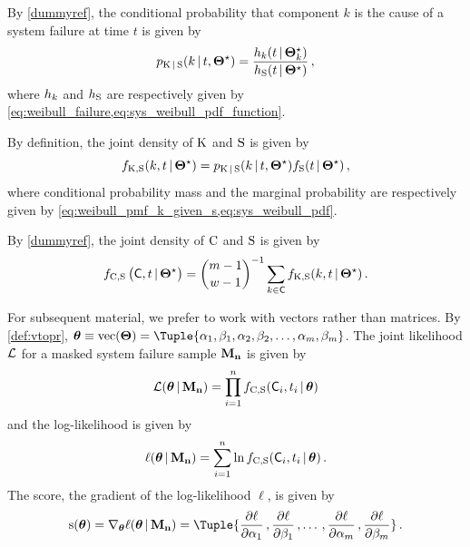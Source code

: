 \documentclass[
    11pt,
    extrafontsizes,
    article,
    oldfontcommands,
    final,
    oneside,
    openany,
    hidelinks]{memoir}
\begin{document}
By \cref{dummyref}, the conditional probability that component $k$ is the cause of a system failure at time $t$ is given by
\begin{equation}
\label{eq:weibull_pmf_k_given_s}
p_{\mathrm{K} {\,|\,} \mathrm{S}}(k {\,|\,} t, {\boldsymbol{\Theta}}^{\star}) = \frac
    {h_k(t {\,|\,} {\boldsymbol{\Theta}}^{\star}_k)}
    {h_{\mathrm{S}}(t {\,|\,} {\boldsymbol{\Theta}}^{\star})}\,,
\end{equation}
where $h_k$ and $h_{\mathrm{S}}$ are respectively given by \cref{eq:weibull_failure,eq:sys_weibull_pdf_function}.

By definition, the joint density of $\mathrm{K}$ and $\mathrm{S}$ is given by
\begin{equation}
\label{eq:weibull_joint_k_s}
f_{\mathrm{K}, \mathrm{S}}( k, t {\,|\,} {\boldsymbol{\Theta}}^{\star}) =
    p_{\mathrm{K} {\,|\,} \mathrm{S}}(k {\,|\,} t, {\boldsymbol{\Theta}}^{\star}) f_{\mathrm{S}}(t {\,|\,} {\boldsymbol{\Theta}}^{\star})\,,
\end{equation}
where conditional probability mass and the marginal probability are respectively given by \cref{eq:weibull_pmf_k_given_s,eq:sys_weibull_pdf}.

By \cref{dummyref}, the joint density of $\mathrm{C}$ and $\mathrm{S}$ is given by
\begin{equation}
\label{eq:weibull_joint_cand_density}
\pdf_{\rvcand, \sv}\left(\cand, t \given \tparam\sysparam \right) =
    {{m-1} \choose {w-1}}^{-1} \sum_{k \in \cand} \pdf_{\RV{K}, \sv}( k, t \given \tparam\sysparam)\,.
\end{equation}

For subsequent material, we prefer to work with vectors rather than matrices. By \cref{def:vtopr}, $\sysparamvec \equiv \vtopr(\sysparam) = \Tuple{\alpha_1,\beta_1,\alpha_2,\beta_2,\ldots,\alpha_m,\beta_m}$.
The joint likelihood $\operatorname{\mathcal{L}}$ for a masked system failure sample $\boldsymbol{\mathbf{M_n}}$ is given by
\begin{equation}
\likelihood(\sysparamvec \given \mfs) =
    \prod_{i=1}^{n} \pdf_{\rvcand, \sv}(\cand_i, t_i \given \sysparamvec)
\end{equation}
and the log-likelihood is given by
\begin{equation}
    \ell(\sysparamvec \given \mfs) =
        \sum_{i=1}^{n} \ln \pdf_{\rvcand, \sv}(\cand_i, t_i \given \sysparamvec)\,.
\end{equation}
The score, the gradient of the log-likelihood $\ell$, is given by
\begin{equation}
    \score(\sysparamvec) = \nabla_{\sysparamvec} \ell(\sysparamvec \given \mfs) = \Tuple{
        \ppderivative{\ell}{\alpha_1}\,,
        \ppderivative{\ell}{\beta_1}\,,
        \ldots\,,
        \ppderivative{\ell}{\alpha_m}\,,
        \ppderivative{\ell}{\beta_m}}\,.
\end{equation}
\end{document}
